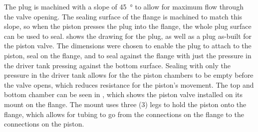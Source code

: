 

The plug is machined with a slope of \SI{45}{\degree} to allow for maximum flow through the valve opening. The sealing surface of the flange is machined to match this slope, so when the piston presses the plug into the flange, the whole plug surface can be used to seal.  shows the drawing for the plug, as well as a plug as-built for the piston valve. The dimensions were chosen to enable the plug to attach to the piston, seal on the flange, and to seal against the flange with just the pressure in the driver tank pressing against the bottom surface. Sealing with only the pressure in the driver tank allows for the the piston chambers to be empty before the valve opens, which reduces resistance for the piston's movement. The top and bottom chamber can be seen in , which shows the piston valve installed on its mount on the flange. The mount uses three (3) legs to hold the piston onto the flange, which allows for tubing to go from the connections on the flange to the connections on the piston.

